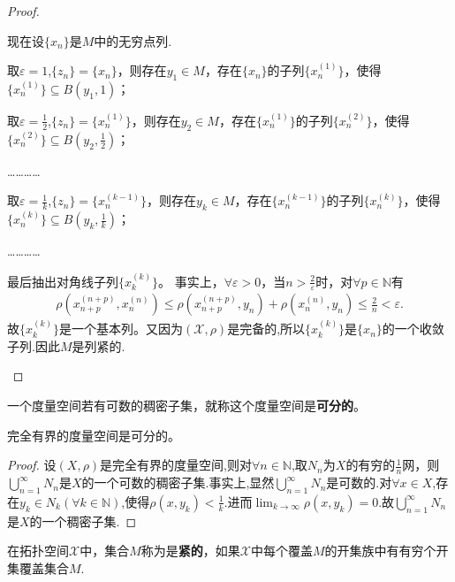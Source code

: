 \documentclass[../../main.tex]{subfiles}%
\begin{document}
\begin{proof}
\begin{enumerate}[(1)]
现在设$\{x_n\}$是$M$中的无穷点列.

取$\varepsilon =1$,$\{z_n\}=\{x_n\}$，则存在$y_1\in M$，存在$\{x_n\}$的子列$\{x_n^{(1)}\}$，使得$\{x_n^{(1)}\}\subseteq B\left( y_1,1 \right)$；

取$\varepsilon =\frac{1}{2}$,$\{z_n\}=\{x_n^{(1)}\}$，则存在$y_2\in M$，存在$\{x_n^{(1)}\}$的子列$\{x_n^{(2)}\}$，使得$\{x_n^{(2)}\}\subseteq B\left( y_2,\frac{1}{2} \right)$；

…………

取$\varepsilon =\frac{1}{k}$,$\{z_n\}=\{x_n^{(k-1)}\}$，则存在$y_k\in M$，存在$\{x_n^{(k-1)}\}$的子列$\{x_n^{(k)}\}$，使得$\{x_n^{(k)}\}\subseteq B\left( y_k,\frac{1}{k} \right)$；

…………

最后抽出对角线子列$\{x_k^{(k)}\}$。
事实上，$\forall\varepsilon>0$，当$n>\frac{2}{\varepsilon}$时，对$\forall p\in\mathbb{N}$有
\begin{align*}
\rho(x_{n+p}^{(n+p)},x_n^{(n)})\leqslant\rho(x_{n+p}^{(n+p)},y_n)+\rho(x_n^{(n)},y_n) 
\leqslant\frac{2}{n}<\varepsilon.
\end{align*}
故$\{x_k^{(k)}\}$是一个基本列。又因为$(\mathscr{X},\rho)$是完备的,所以$\{x_k^{(k)}\}$是$\{x_n\}$的一个收敛子列.因此$M$是列紧的.
\end{enumerate}
\end{proof}

\begin{definition}
一个度量空间若有可数的稠密子集，就称这个度量空间是\textbf{可分的}。
\end{definition}

\begin{theorem}
完全有界的度量空间是可分的。
\end{theorem}
\begin{proof}

设$(X,\rho)$是完全有界的度量空间,则对$\forall n\in \mathbb{N}$,取$N_n$为$X$的有穷的$\frac{1}{n}$网，则$\bigcup\limits_{n=1}^\infty N_n$是$X$的一个可数的稠密子集.事实上,显然$\bigcup\limits_{n=1}^\infty N_n$是可数的.对$\forall x\in X$,存在$y_k\in N_k(\forall k\in \mathbb{N})$,使得$\rho(x,y_k)<\frac{1}{k}$.进而$\lim_{k\to \infty}\rho(x,y_k)=0$.故$\bigcup\limits_{n=1}^\infty N_n$是$X$的一个稠密子集.

\end{proof}

\begin{definition}
在拓扑空间$\mathscr{X}$中，集合$M$称为是\textbf{紧的}，如果$\mathscr{X}$中每个覆盖$M$的开集族中有有穷个开集覆盖集合$M$.
\end{definition}
\end{document}

